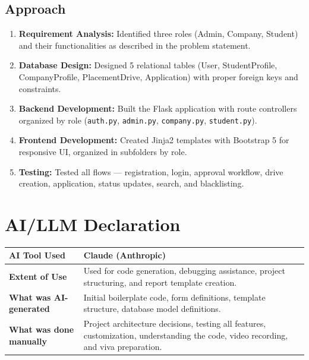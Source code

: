 \documentclass[12pt,a4paper]{article}
\begin{document}
\subsection{Approach}
\begin{enumerate}[leftmargin=*]
    \item \textbf{Requirement Analysis:} Identified three roles (Admin, Company, Student)
          and their functionalities as described in the problem statement.
    \item \textbf{Database Design:} Designed 5 relational tables (User, StudentProfile,
          CompanyProfile, PlacementDrive, Application) with proper foreign keys and
          constraints.
    \item \textbf{Backend Development:} Built the Flask application with route controllers
          organized by role (\texttt{auth.py}, \texttt{admin.py}, \texttt{company.py},
          \texttt{student.py}).
    \item \textbf{Frontend Development:} Created Jinja2 templates with Bootstrap 5 for
          responsive UI, organized in subfolders by role.
    \item \textbf{Testing:} Tested all flows --- registration, login, approval workflow,
          drive creation, application, status updates, search, and blacklisting.
\end{enumerate}

\section{AI/LLM Declaration}

\begin{tabularx}{\textwidth}{|l|X|}
\hline
\textbf{AI Tool Used}       & Claude (Anthropic)                             \\ \hline
\textbf{Extent of Use}      & Used for code generation, debugging assistance,
                               project structuring, and report template creation. \\ \hline
\textbf{What was AI-generated} & Initial boilerplate code, form definitions,
                               template structure, database model definitions.    \\ \hline
\textbf{What was done manually} & Project architecture decisions, testing all
                               features, customization, understanding the code,
                               video recording, and viva preparation.            \\ \hline
\end{tabularx}
\end{document}
